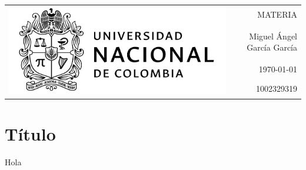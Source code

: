 \documentclass[11pt]{article} %
\begin{document}
	
	\onehalfspacing %
	\setlength{\parskip}{\baselineskip} %
	
	\noindent %
	\begin{tabularx}{\textwidth}{Y r}
		 & MATERIA\\
		& Miguel Ángel García García\\
		& \today\\
		& 1002329319\\ 		
	\end{tabularx}

	\vspace{15pt}
			
	\section*{Título}
		
	\noindent	
	Hola 
	
%	
%	
\end{document}
